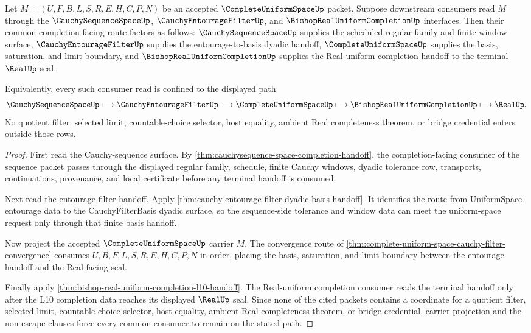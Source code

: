 \begin{theorem}
\label{thm:complete-uniform-space-cauchy-sequence-entourage-real-factorization}
Let $M=(U,F,B,L,S,R,E,H,C,P,N)$ be an accepted $\CompleteUniformSpaceUp$ packet. Suppose downstream consumers read $M$ through the $\CauchySequenceSpaceUp$, $\CauchyEntourageFilterUp$, and $\BishopRealUniformCompletionUp$ interfaces. Then their common completion-facing route factors as follows: $\CauchySequenceSpaceUp$ supplies the scheduled regular-family and finite-window surface, $\CauchyEntourageFilterUp$ supplies the entourage-to-basis dyadic handoff, $\CompleteUniformSpaceUp$ supplies the basis, saturation, and limit boundary, and $\BishopRealUniformCompletionUp$ supplies the Real-uniform completion handoff to the terminal $\RealUp$ seal.

Equivalently, every such consumer read is confined to the displayed path
$$
\CauchySequenceSpaceUp \longmapsto \CauchyEntourageFilterUp \longmapsto \CompleteUniformSpaceUp \longmapsto \BishopRealUniformCompletionUp \longmapsto \RealUp .
$$
No quotient filter, selected limit, countable-choice selector, host equality, ambient Real completeness theorem, or bridge credential enters outside those rows.
\end{theorem}
\begin{proof}
First read the Cauchy-sequence surface. By \autoref{thm:cauchysequence-space-completion-handoff}, the completion-facing consumer of the sequence packet passes through the displayed regular family, schedule, finite Cauchy windows, dyadic tolerance row, transports, continuations, provenance, and local certificate before any terminal handoff is consumed.

Next read the entourage-filter handoff. Apply \autoref{thm:cauchy-entourage-filter-dyadic-basis-handoff}. It identifies the route from UniformSpace entourage data to the CauchyFilterBasis dyadic surface, so the sequence-side tolerance and window data can meet the uniform-space request only through that finite basis handoff.

Now project the accepted $\CompleteUniformSpaceUp$ carrier $M$. The convergence route of \autoref{thm:complete-uniform-space-cauchy-filter-convergence} consumes $U,B,F,L,S,R,E,H,C,P,N$ in order, placing the basis, saturation, and limit boundary between the entourage handoff and the Real-facing seal.

Finally apply \autoref{thm:bishop-real-uniform-completion-l10-handoff}. The Real-uniform completion consumer reads the terminal handoff only after the L10 completion data reaches its displayed $\RealUp$ seal. Since none of the cited packets contains a coordinate for a quotient filter, selected limit, countable-choice selector, host equality, ambient Real completeness theorem, or bridge credential, carrier projection and the non-escape clauses force every common consumer to remain on the stated path.
\end{proof}

